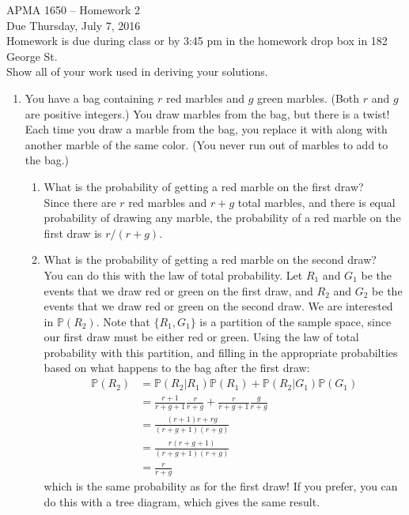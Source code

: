 \documentclass[12pt]{article}
\def\P{{\mathbb P}}
\begin{document}
\title{}
\author{\vspace{-10ex} }

\begin{center}
{\LARGE APMA 1650 -- Homework 2}\\
\vspace{5mm}
{\large Due Thursday, July 7, 2016}\\
\vspace{5mm}
Homework is due during class or by 3:45 pm in the homework drop box in 182 George St.\\
Show all of your work used in deriving your solutions.
\end{center}

\begin{enumerate}

\item You have a bag containing $r$ red marbles and $g$ green marbles. (Both $r$ and $g$ are positive integers.) You draw marbles from the bag, but there is a twist! Each time you draw a marble from the bag, you replace it with along with another marble of the same color. (You never run out of marbles to add to the bag.)
\begin{enumerate}
\item What is the probability of getting a red marble on the first draw?\\

Since there are $r$ red marbles and $r + g$ total marbles, and there is equal probability of drawing any marble, the probability of a red marble on the first draw is $r / (r + g)$.

\item What is the probability of getting a red marble on the second draw? \\

You can do this with the law of total probability. Let $R_1$ and $G_1$ be the events that we draw red or green on the first draw, and $R_2$ and $G_2$ be the events that we draw red or green on the second draw. We are interested in $\P(R_2)$. Note that $\{R_1, G_1\}$ is a partition of the sample space, since our first draw must be either red or green. Using the law of total probability with this partition, and filling in the appropriate probabilties based on what happens to the bag after the first draw:
\begin{align*}
\P(R_2) &= \P(R_2|R_1)\P(R_1) + \P(R_2|G_1)\P(G_1) \\
&= \frac{r+1}{r+g+1}\frac{r}{r+g} + \frac{r}{r+g+1}\frac{g}{r+g}\\
&= \frac{(r+1)r + rg}{(r+g+1)(r+g)}\\
&= \frac{r(r+g+1)}{(r+g+1)(r+g)}\\
&= \frac{r}{r+g}
\end{align*}
which is the same probability as for the first draw! If you prefer, you can do this with a tree diagram, which gives the same result. 


\end{enumerate}
\end{enumerate}
\end{document}
